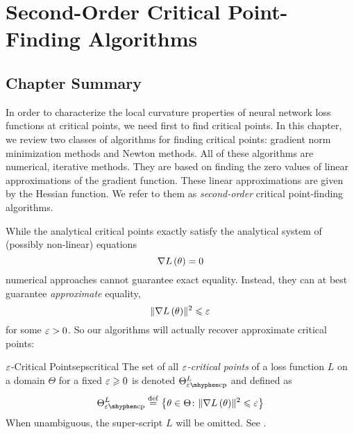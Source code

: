 \documentclass[../../thesis.tex]{subfiles}
\begin{document}
\chapter{%
Second-Order Critical Point-Finding Algorithms
}
\onlyinsubfile{\begin{KeepFromToc}
		\tableofcontents
		\listofalgorithms{}
	\end{KeepFromToc}}
\onlyinsubfile{\clearpage}
\onlyinsubfile{\linenumbers}

\section{Chapter Summary}

In order to characterize the local curvature properties
of neural network loss functions at critical points,
we need first to find critical points.
In this chapter,
we review two classes of algorithms for finding critical points:
gradient norm minimization methods
and Newton methods.
All of these algorithms are
numerical, iterative methods.
They are based on finding the zero values of linear approximations
of the gradient function.
These linear approximations are given by the Hessian function.
We refer to them as \emph{second-order}
critical point-finding algorithms.

While the analytical critical points exactly satisfy
the analytical system of (possibly non-linear) equations
\begin{equation}\equationlabel{gradienteqns}
	\grad{L}{\theta} = 0
\end{equation}
\noindent numerical approaches cannot guarantee
exact equality.
Instead, they can at best guarantee \emph{approximate} equality,
\begin{equation}\equationlabel{gradienteps}
	\sgn{L}{\theta} \leq \eps
\end{equation}
\noindent for some $\varepsilon > 0$.
So our algorithms will actually recover approximate critical points:

\begin{definition}{$\varepsilon$-Critical Points}{epscritical}
	The set of all \emph{$\varepsilon$-critical points} of a loss function $L$
	on a domain $\Theta$ for a fixed $\varepsilon\geqslant0$ is denoted $\Theta^L_{\ecp}$
	and defined as
	\begin{equation}\equationlabel{def-epscp}
		\Theta^L_{\ecp} \defeq
		\Set{\theta \in \Theta \suchthat \sgn{L}{\theta} \leq \eps}
	\end{equation}
	When unambiguous, the super-script $L$ will be omitted.
	See .
\end{definition}
\end{document}
